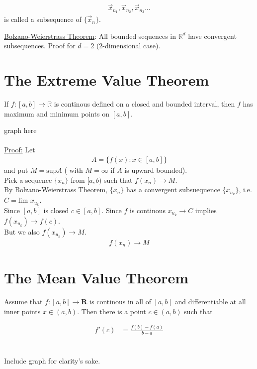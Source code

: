 \documentclass[12pt,letterpaper]{article}
\begin{document}
\begin{align*}
	\vec{x}_{n_1}, \vec{x}_{n_2}, \vec{x}_{n_3}...
\end{align*}
is called a subsequence of $\{\vec{x}_n \}$.



\uline{Bolzano-Weierstrass Theorem}: All bounded sequences in $\mathbb{R}^d$ have convergent subsequences. 
Proof for $d=2$ (2-dimensional case). 




\section*{The Extreme Value Theorem}
If $f:[a,b]\to\mathbb{R}$ is continous defined on a closed and bounded interval, then $f$ has maximum and minimum points on $[a,b]$.

graph here \\
\\
\uline{Proof:} Let
\begin{align*}
	A = \{ f(x) : x\in[a,b]\}
\end{align*}
and put $M = \text{sup} A$ ( with $M=\infty$ if $A$ is upward bounded). \\

Pick a sequence $\{x_n\}$ from $[a,b)$ such that $f(x_n)\to M$.\\

By Bolzano-Weierstrass Theorem, $\{x_n\}$ has a convergent subsuequence $\{x_{n_k}\}$, i.e. $C = \text{lim } x_{u_k}$.\\

Since $[a,b]$ is closed $c\in [a,b]$. Since $f$ is continous $x_{u_k}\to C$ implies $f(x_{u_k})\to f(c)$.\\

 But we also $f(x_{u_k}) \to M$.\\

\begin{align*}
	f(x_n) \to M
\end{align*}













\section*{The Mean Value Theorem}
Assume that $f : [a,b] \to \mathbf{R}$ is continous in all of $[a,b]$ and differentiable at all inner points $x \in (a,b)$. Then there is a point $c \in (a,b)$ such that 

\begin{align*}
	f'(c) &= \frac{f(b)-f(a)}{b-a} \\
\end{align*}

\noindent \\
Include graph for clarity's sake.


\end{document}
